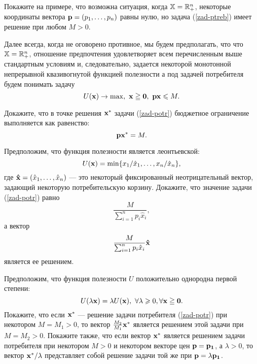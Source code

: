 \begin{exer}
    Покажите на примере, что возможна ситуация, когда
    $\mathbb{X}=\mathbb{R}^{n}_{+}$, некоторые координаты вектора
    $\mathbf{p}=(p_{1},\ldots,p_{n})$ равны нулю, но задача (\ref{zad-ptreb}) имеет
    решение при любом $M>0$.
\end{exer}

    Далее всегда, когда не оговорено противное, мы будем
    предполагать, что что $\mathbb{X}=\mathbb{R}^{n}_{+}$, отношение
    предпочтения удовлетворяет всем перечисленным выше стандартным
    условиям и, следовательно, задается некоторой монотонной непрерывной
    квазивогнутой функцией полезности а под задачей потребителя
    будем понимать задачу
    \begin{equation}
\label{zad-potr}
    U(\vc{x})\rightarrow\max, \ \vc{x}\geqq\vc{0},  \ \vc{p}\vc{x}\leqslant M.
\end{equation}

\begin{exer}
    Докажите, что в точке решения $\mathbf{x^{*}}$ задачи (\ref{zad-potr})
    бюджетное ограничение выполняется как равенство:
    \[\mathbf{p}\mathbf{x^{*}}=M.\]
\end{exer}


\begin{exer}
    Предположим, что функция полезности является леонтьевской:
    \[U(\mathbf{x})=\min\{x_{1}/\hat{x}_{1},\ldots,x_{n}/\hat{x}_{n}\},\]
    где $\mathbf{\hat{x}}=(\hat{x}_{1},\ldots,\hat{x}_{n})$ --- это
    некоторый
    фиксированный неотрицательный вектор, задающий некоторую потребительскую
    корзину.
    Докажите, что значение задачи (\ref{zad-potr}) равно
    \[\frac{M}{\sum_{i=1}^{n}p_{i}\hat{x}_{i}},\]
    а вектор
    \[\frac{M}{\sum_{i=1}^{n}p_{i}\hat{x}_{i}}\mathbf{\hat{x}}\]
    является ее решением.
\end{exer}




\begin{exer}
    Предположим, что функция полезности $U$ положительно однородна
    первой степени:
    \[U(\lambda\vc{x})=\lambda U(\vc{x}), \ \forall\lambda\geqslant0, \forall\vc{x}\geqq\vc{0}.\]
    Покажите, что если $\mathbf{x^{*}}$ --- решение задачи потребителя
    (\ref{zad-potr}) при некотором $M=M_{1}>0$, то вектор
    $\frac{M_{2}}{M_{1}}\mathbf{x^{*}}$ является решением этой задачи при
    $M=M_{2}>0$. Покажите также, что если вектор $\mathbf{x^{*}}$
    является решением задачи потребителя при некотором $M>0$ и
    некотором векторе цен $\mathbf{p}=\mathbf{p_{1}}$, а $\lambda>0$, то вектор
    $\mathbf{x^{*}}/\lambda$ представляет собой решение задачи той же при
    $\mathbf{p}=\lambda\mathbf{p_{1}}$.
\end{exer}

